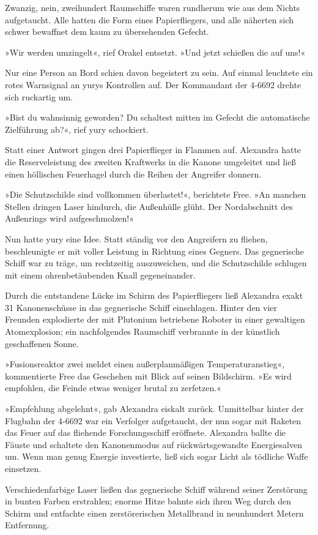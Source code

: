 Zwanzig, nein, zweihundert Raumschiffe waren rundherum wie aus dem Nichts aufgetaucht. Alle hatten die Form eines Papierfliegers, und alle näherten sich schwer bewaffnet dem kaum zu übersehenden Gefecht.

»Wir werden umzingelt«, rief Orakel entsetzt. »Und jetzt schießen die auf uns!«

Nur eine Person an Bord schien davon begeistert zu sein. Auf einmal leuchtete ein rotes Warnsignal an yurys Kontrollen auf. Der Kommandant der 4-6692 drehte sich ruckartig um.

»Bist du wahnsinnig geworden? Du schaltest mitten im Gefecht die automatische Zielführung ab?«, rief yury schockiert.

Statt einer Antwort gingen drei Papierflieger in Flammen auf. Alexandra hatte die Reserveleistung des zweiten Kraftwerks in die Kanone umgeleitet und ließ einen höllischen Feuerhagel durch die Reihen der Angreifer donnern.

»Die Schutzschilde sind vollkommen überlastet!«, berichtete Free. »An manchen Stellen dringen Laser hindurch, die Außenhülle glüht. Der Nordabschnitt des Außenrings wird aufgeschmolzen!«

Nun hatte yury eine Idee. Statt ständig vor den Angreifern zu fliehen, beschleunigte er mit voller Leistung in Richtung eines Gegners. Das gegnerische Schiff war zu träge, um rechtzeitig auszuweichen, und die Schutzschilde schlugen mit einem ohrenbetäubenden Knall gegeneinander.

Durch die entstandene Lücke im Schirm des Papierfliegers ließ Alexandra exakt 31 Kanonenschüsse in das gegnerische Schiff einschlagen. Hinter den vier Freunden explodierte der mit Plutonium betriebene Roboter in einer gewaltigen Atomexplosion; ein nachfolgendes Raumschiff verbrannte in der künstlich geschaffenen Sonne.

»Fusionsreaktor zwei meldet einen außerplanmäßigen Temperaturanstieg«, kommentierte Free das Geschehen mit Blick auf seinen Bildschirm. »Es wird empfohlen, die Feinde etwas weniger brutal zu zerfetzen.«

»Empfehlung abgelehnt«, gab Alexandra eiskalt zurück. Unmittelbar hinter der Flugbahn der 4-6692 war ein Verfolger aufgetaucht, der nun sogar mit Raketen das Feuer auf das fliehende Forschungsschiff eröffnete. Alexandra ballte die Fäuste und schaltete den Kanonenmodus auf rückwärtsgewandte Energiesalven um. Wenn man genug Energie investierte, ließ sich sogar Licht als tödliche Waffe einsetzen.

Verschiedenfarbige Laser ließen das gegnerische Schiff während seiner Zerstörung in bunten Farben erstrahlen; enorme Hitze bahnte sich ihren Weg durch den Schirm und entfachte einen zerstörerischen Metallbrand in neunhundert Metern Entfernung.

